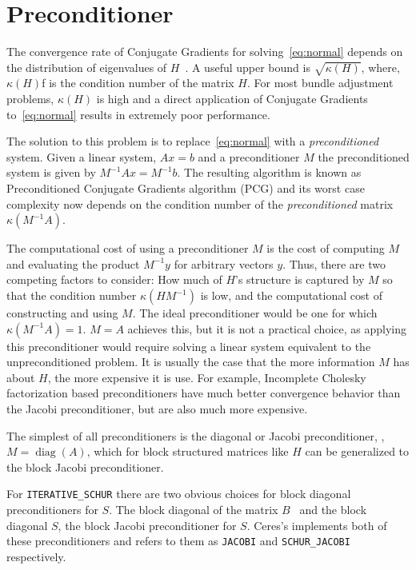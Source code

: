 \section{Preconditioner}
The convergence rate of Conjugate Gradients  for solving~\eqref{eq:normal} depends on the distribution of eigenvalues of $H$~\cite{saad2003iterative}. A useful upper bound is $\sqrt{\kappa(H)}$, where, $\kappa(H)$f is the condition number of the matrix $H$. For most bundle adjustment problems, $\kappa(H)$ is high and a direct application of Conjugate Gradients to~\eqref{eq:normal} results in extremely poor performance.

The solution to this problem is to replace~\eqref{eq:normal} with a {\em preconditioned} system.  Given a linear system, $Ax =b$ and a preconditioner $M$ the preconditioned system is given by $M^{-1}Ax = M^{-1}b$. The resulting algorithm is known as Preconditioned Conjugate Gradients algorithm (PCG) and its  worst case complexity now depends on the condition number of the {\em preconditioned} matrix $\kappa(M^{-1}A)$.

The computational cost of using a preconditioner $M$ is the cost of computing $M$ and evaluating the product $M^{-1}y$ for arbitrary vectors $y$. Thus, there are two competing factors to consider: How much of $H$'s structure is captured by $M$ so that the condition number $\kappa(HM^{-1})$ is low, and the computational cost of constructing and using $M$.  The ideal preconditioner would be one for which $\kappa(M^{-1}A) =1$. $M=A$ achieves this, but it is not a practical choice, as applying this preconditioner would require solving a linear system equivalent to the unpreconditioned problem.  It is usually the case that the more information $M$ has about $H$, the more expensive it is use. For example, Incomplete Cholesky factorization based preconditioners  have much better convergence behavior than the Jacobi preconditioner, but are also much more expensive.


The simplest of all preconditioners is the diagonal or Jacobi preconditioner, \ie,  $M=\operatorname{diag}(A)$, which for block structured matrices like $H$ can be generalized to the block Jacobi preconditioner.

For \texttt{ITERATIVE\_SCHUR} there are two obvious choices for block diagonal preconditioners for $S$. The block diagonal of the matrix $B$~\cite{mandel1990block} and the block diagonal $S$, \ie the block Jacobi preconditioner for $S$. Ceres's implements both of these preconditioners and refers to them as  \texttt{JACOBI} and \texttt{SCHUR\_JACOBI} respectively.

